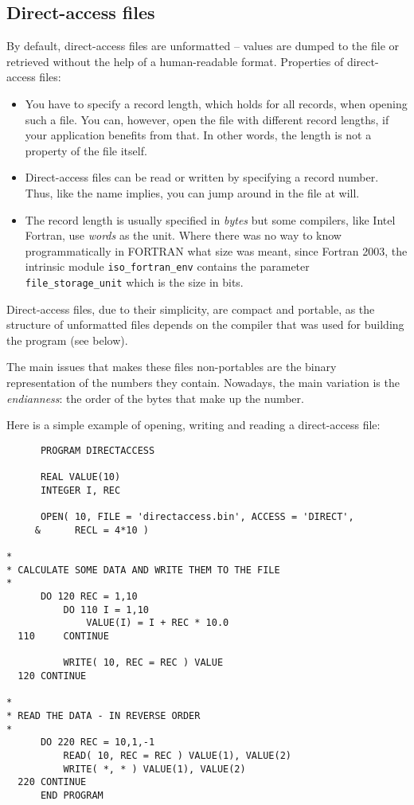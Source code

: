 \subsection{Direct-access files}
By default, direct-access files are unformatted -- values are dumped to the file or retrieved
without the help of a human-readable format. Properties of direct-access files:
\begin{itemize}
\item
You have to specify a record length, which holds for all records, when opening such a file.
You can, however, open the file with different record lengths, if your application benefits
from that. In other words, the length is not a property of the file itself.
\item
Direct-access files can be read or written by specifying a record number. Thus, like the name
implies, you can jump around in the file at will.
\item
The record length is usually specified in \emph{bytes} but some compilers, like Intel Fortran,
use \emph{words} as the unit. Where there was no way to know programmatically in FORTRAN what
size was meant, since Fortran 2003, the intrinsic module \verb+iso_fortran_env+ contains the parameter \verb+file_storage_unit+
which is the size in bits.
\end{itemize}

Direct-access files, due to their simplicity, are compact and portable, as the structure of
unformatted files depends on the compiler that was used for building the program (see below).

The main issues that makes these files non-portables are the binary representation of the
numbers they contain. Nowadays, the main variation is the \emph{endianness}: the order of the
bytes that make up the number.

Here is a simple example of opening, writing and reading a direct-access file:

\begin{verbatim}
      PROGRAM DIRECTACCESS

      REAL VALUE(10)
      INTEGER I, REC

      OPEN( 10, FILE = 'directaccess.bin', ACCESS = 'DIRECT',
     &      RECL = 4*10 )

*
* CALCULATE SOME DATA AND WRITE THEM TO THE FILE
*
      DO 120 REC = 1,10
          DO 110 I = 1,10
              VALUE(I) = I + REC * 10.0
  110     CONTINUE

          WRITE( 10, REC = REC ) VALUE
  120 CONTINUE

*
* READ THE DATA - IN REVERSE ORDER
*
      DO 220 REC = 10,1,-1
          READ( 10, REC = REC ) VALUE(1), VALUE(2)
          WRITE( *, * ) VALUE(1), VALUE(2)
  220 CONTINUE
      END PROGRAM
\end{verbatim}

